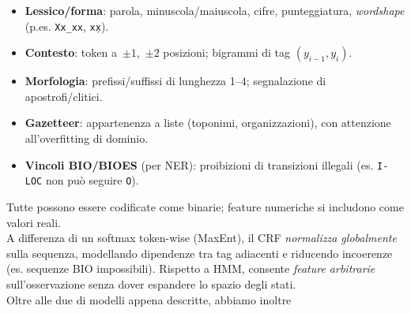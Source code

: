                 \begin{itemize}
                
                    \item \textbf{Lessico/forma}: parola, minuscola/maiuscola, cifre, punteggiatura, \emph{wordshape} (p.es. \texttt{Xx\_xx}, \texttt{xx\d}).
                    
                    \item \textbf{Contesto}: token a \,$\pm1$, \,$\pm2$ posizioni; bigrammi di tag $(y_{i-1},y_i)$.
                    
                    \item \textbf{Morfologia}: prefissi/suffissi di lunghezza 1–4; segnalazione di apostrofi/clitici.
                    
                    \item \textbf{Gazetteer}: appartenenza a liste (toponimi, organizzazioni), con attenzione all’overfitting di dominio.
                    
                    \item \textbf{Vincoli BIO/BIOES} (per NER): proibizioni di transizioni illegali (es. \texttt{I-LOC} non può seguire \texttt{O}).
                    
                \end{itemize}
                
                Tutte possono essere codificate come binarie; feature numeriche si includono come valori reali.\\
                
                A differenza di un softmax token-wise (MaxEnt), il CRF \emph{normalizza globalmente} sulla sequenza, modellando dipendenze tra tag adiacenti e riducendo incoerenze (es. sequenze BIO impossibili). Rispetto a HMM, consente \emph{feature arbitrarie} sull’osservazione senza dover espandere lo spazio degli stati.\\                

            \noindent\newline
            Oltre alle due di modelli appena descritte, abbiamo inoltre
    
